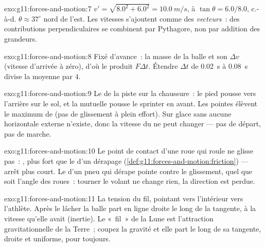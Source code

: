 \begin{solution}{exo:g11:forces-and-motion:7}
$v' = \sqrt{8.0^2 + 6.0^2} = \qty{10.0}{m/s}$, à $\tan\theta =
6.0/8.0$, c.-à-d. $\theta \approx 37^\circ$ nord de l'est. Les
vitesses s'ajoutent comme des \emph{vecteurs}~: des contributions
perpendiculaires se combinent par Pythagore, non par addition des
grandeurs.
\end{solution}

\begin{solution}{exo:g11:forces-and-motion:8}
Fixé d'avance~: la masse de la balle et son $\Delta v$ (vitesse
d'arrivée à zéro), d'où le produit $F\Delta t$. Étendre $\Delta t$ de
\qty{0.02}{s} à \qty{0.08}{s} divise la
 moyenne par $4$.
\end{solution}

\begin{solution}{exo:g11:forces-and-motion:9}
Le  de la piste sur la
chaussure~: le pied pousse vers l'arrière sur le sol, et la
 mutuelle pousse le
sprinter en avant. Les pointes élèvent le maximum de
 (pas de glissement à
plein effort). Sur glace sans  aucune
 horizontale externe n'existe, donc
la vitesse du  ne peut
changer --- pas de départ, pas de marche.
\end{solution}

\begin{solution}{exo:g11:forces-and-motion:10}
Le point de contact d'une roue qui roule ne glisse pas~:
, plus fort que le
 d'un dérapage
(\cref{def:g11:forces-and-motion:friction}) --- arrêt plus court. Le
 d'un pneu qui
dérape pointe contre le glissement, quel que soit l'angle des roues~:
tourner le volant ne change rien, la direction est perdue.
\end{solution}

\begin{solution}{exo:g11:forces-and-motion:11}
La tension du fil, pointant vers
l'intérieur vers l'athlète. Après le lâcher la balle part en ligne
droite le long de la tangente, à la vitesse qu'elle avait (inertie).
Le «~fil~» de la Lune est l'attraction gravitationnelle de la Terre~;
coupez la gravité et elle part le long de sa tangente, droite et
uniforme, pour toujours.
\end{solution}

